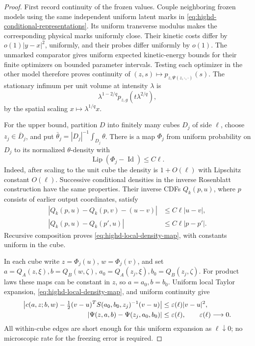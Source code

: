 \documentclass[11pt,reqno]{amsart}
\theoremstyle{definition}
\theoremstyle{remark}
\numberwithin{equation}{section}
\begin{document}
\begin{proof}
First record continuity of the frozen values. Couple neighboring frozen
models using the same independent uniform latent marks in
\eqref{eq:highd-conditional-representations}. Its uniform transverse
modulus makes the corresponding physical marks uniformly close.
Their kinetic costs differ by \(o(1)|y-x|^2\), uniformly, and their
probes differ uniformly by \(o(1)\). The unmarked comparator gives
uniform expected kinetic-energy bounds for their finite optimizers on
bounded parameter intervals. Testing each optimizer in the other model
therefore proves continuity of
\((z,s)\mapsto p_{z,\Psi(z,\cdot,\cdot)}(s)\).
The stationary infimum per unit volume at intensity \(\lambda\) is
\begin{equation}
\label{eq:highd-variable-intensity-scaling}
 \lambda^{1-2/q}p_{z,g}(t\lambda^{2/q}),
\end{equation}
by the spatial scaling \(x\mapsto\lambda^{1/q}x\).

For the upper bound, partition \(D\) into finitely many cubes \(D_j\)
of side \(\ell\), choose \(z_j\in\overline D_j\), and put
\(\bar\theta_j=|D_j|^{-1}\int_{D_j}\theta\).
There is a map \(\Phi_j\) from uniform probability on \(D_j\) to
its normalized \(\theta\)-density with
\begin{equation}
\label{eq:highd-local-density-map}
 \operatorname{Lip}(\Phi_j-\operatorname{Id})\le C\ell.
\end{equation}
Indeed, after scaling to the unit cube the density is \(1+O(\ell)\)
with Lipschitz constant \(O(\ell)\). Successive conditional densities
in the inverse Rosenblatt construction have the same properties.
Their inverse CDFs \(Q_k(p,u)\), where \(p\) consists of earlier
output coordinates, satisfy
\[
 \begin{split}
 |Q_k(p,u)-Q_k(p,v)-(u-v)|&\le C\ell|u-v|,\\
 |Q_k(p,u)-Q_k(p',u)|&\le C\ell|p-p'|.
 \end{split}
\]
Recursive composition proves \eqref{eq:highd-local-density-map}, with
constants uniform in the cube.

In each cube write \(z=\Phi_j(u)\), \(w=\Phi_j(v)\), and set
\(a=Q_A(z,\xi),b=Q_B(w,\zeta)\),
\(a_0=Q_A(z_j,\xi),b_0=Q_B(z_j,\zeta)\).
For product laws these maps can be constant in \(z\), so
\(a=a_0,b=b_0\). Uniform local Taylor expansion,
\eqref{eq:highd-local-density-map}, and uniform continuity give
\begin{align}
\label{eq:highd-block-freezing}
 \left|c(a,z;b,w)-\tfrac12(v-u)^TS(a_0,b_0,z_j)^{-1}(v-u)\right|
      &\le\varepsilon(\ell)|v-u|^2,\notag\\
 |\Psi(z,a,b)-\Psi(z_j,a_0,b_0)|&\le\varepsilon(\ell),
 \qquad \varepsilon(\ell)\longrightarrow0.
\end{align}
All within-cube edges are short enough for this uniform expansion as
\(\ell\downarrow0\); no microscopic rate for the freezing error is
required.


\end{proof}
\end{document}
